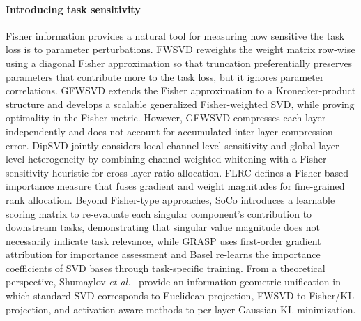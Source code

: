 \paragraph{Introducing task sensitivity}
Fisher information provides a natural tool for measuring how sensitive the task loss is to parameter perturbations. FWSVD \citep{hsu2022fwsvd} reweights the weight matrix row-wise using a diagonal Fisher approximation so that truncation preferentially preserves parameters that contribute more to the task loss, but it ignores parameter correlations. GFWSVD \citep{chekalina2025gfwsvd} extends the Fisher approximation to a Kronecker-product structure and develops a scalable generalized Fisher-weighted SVD, while proving optimality in the Fisher metric. However, GFWSVD compresses each layer independently and does not account for accumulated inter-layer compression error. DipSVD \citep{ding2025dipsvd} jointly considers local channel-level sensitivity and global layer-level heterogeneity by combining channel-weighted whitening with a Fisher-sensitivity heuristic for cross-layer ratio allocation. FLRC \citep{lu2025flrc} defines a Fisher-based importance measure that fuses gradient and weight magnitudes for fine-grained rank allocation. Beyond Fisher-type approaches, SoCo \citep{li2025soco} introduces a learnable scoring matrix to re-evaluate each singular component's contribution to downstream tasks, demonstrating that singular value magnitude does not necessarily indicate task relevance, while GRASP \citep{liu2025grasp} uses first-order gradient attribution for importance assessment and Basel \citep{li2025basel} re-learns the importance coefficients of SVD bases through task-specific training. From a theoretical perspective, Shumaylov \emph{et al.}~\citep{shumaylov2025infogeo} provide an information-geometric unification in which standard SVD corresponds to Euclidean projection, FWSVD to Fisher/KL projection, and activation-aware methods to per-layer Gaussian KL minimization.


